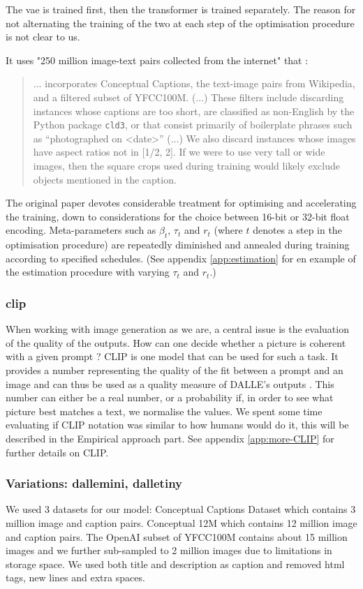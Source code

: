 \documentclass{article}
\begin{document}
\begin{multicols}{2}
The \gls{vae} is trained first, then the \gls{transformer} is trained separately. The reason for not alternating the training of the two at each step of the optimisation procedure is not clear to us.

It uses "250 million image-text pairs collected from the internet" that :
\blockquote{... incorporates Conceptual Captions, the text-image pairs from Wikipedia, and a filtered subset of YFCC100M. (...) These filters include discarding instances whose captions are too short, are classified as non-English by the Python package \texttt{cld3}, or that consist primarily of boilerplate phrases such as “photographed on <date>” (...) We also discard instances whose images have aspect ratios not in [1/2, 2]. If we were to use very tall or wide images, then the square crops used during training would likely exclude objects mentioned in the caption.}

The original paper devotes considerable treatment for optimising and accelerating the training, down to considerations for the choice between 16-bit or 32-bit float encoding. Meta-parameters such as $\beta_t$, $\tau_t$ and $r_t$ (where $t$ denotes a step in the optimisation procedure) are repeatedly diminished and annealed during training according to specified schedules. (See appendix  \ref{app:estimation} for en example of the estimation procedure with varying $\tau_t$ and $r_t$.)

\subsubsection{\gls{clip}}

When working with image generation as we are, a central issue is the evaluation of the quality of the outputs. How can one decide whether a picture is coherent with a given prompt ? CLIP is one model that can be used for such a task. It provides a number representing the quality of the fit between a prompt and an image and can thus be used as a quality measure of DALLE's outputs \citet{learntransf, openaiclip}. This number can either be a real number, or a probability if, in order to see what picture best matches a text, we normalise the values. We spent some time evaluating if CLIP notation was similar to how humans would do it, this will be described in the Empirical approach part. See appendix \ref{app:more-CLIP} for further details on CLIP. 

\subsubsection{Variations: \gls{dallemini}, \gls{dalletiny}}

We used 3 datasets for our model:
﻿Conceptual Captions Dataset which contains 3 million image and caption pairs.
﻿Conceptual 12M which contains 12 million image and caption pairs.
The OpenAI subset of YFCC100M contains about 15 million images and we further sub-sampled to 2 million images due to limitations in storage space. We used both title and description as caption and removed html tags, new lines and extra spaces.




\end{multicols}
\end{document}
